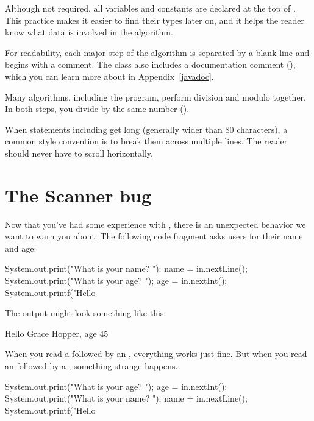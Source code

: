 Although not required, all variables and constants are declared at the top of .
This practice makes it easier to find their types later on, and it helps the reader know what data is involved in the algorithm.


For readability, each major step of the algorithm is separated by a blank line and begins with a comment.
The class also includes a documentation comment (\java{/**}), which you can learn more about in Appendix~\ref{javadoc}.

Many algorithms, including the  program, perform division and modulo together.
In both steps, you divide by the same number ().

When statements including  get long (generally wider than 80 characters), a common style convention is to break them across multiple lines.
The reader should never have to scroll horizontally.


\section{The Scanner bug}

Now that you've had some experience with , there is an unexpected behavior we want to warn you about.
The following code fragment asks users for their name and age:

\begin{code}
System.out.print("What is your name? ");
name = in.nextLine();
System.out.print("What is your age? ");
age = in.nextInt();
System.out.printf("Hello %
\end{code}

The output might look something like this:

\begin{stdout}
Hello Grace Hopper, age 45
\end{stdout}

When you read a  followed by an , everything works just fine.
But when you read an  followed by a , something strange happens.

\begin{code}
System.out.print("What is your age? ");
age = in.nextInt();
System.out.print("What is your name? ");
name = in.nextLine();
System.out.printf("Hello %
\end{code}

